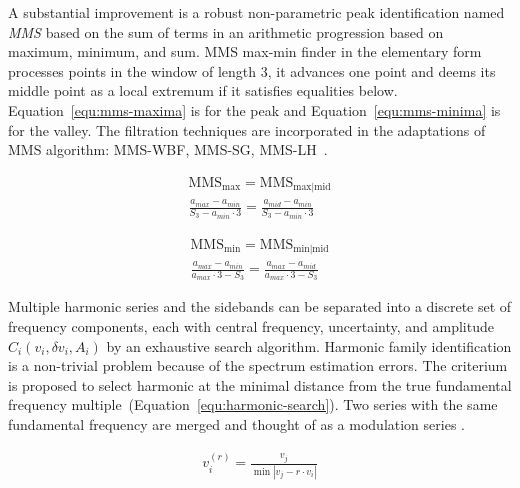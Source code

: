 A substantial improvement is a robust non-parametric peak identification named \emph{MMS} based on the sum of terms in an arithmetic progression based on maximum, minimum, and sum. MMS max-min finder in the elementary form processes points in the window of length 3, it advances one point and deems its middle point as a local extremum if it satisfies equalities below. Equation~\ref{equ:mms-maxima} is for the peak and Equation~\ref{equ:mms-minima} is for the valley. The filtration techniques are incorporated in the adaptations of MMS algorithm: MMS-WBF, MMS-SG, MMS-LH~\cite{adikaram_non-parametric_2016}.

\begin{ceqn}\begin{align}
\mathrm{MMS}_{\mathrm{max}} = \mathrm{MMS}_{\mathrm{max|mid}} \\
\frac{a_{max} - a_{min}}{S_3 - a_{min} \cdot 3} = \frac{a_{mid} - a_{min}}{S_3 - a_{min} \cdot 3}
\label{equ:mms-maxima}
 \end{align}\end{ceqn}

\begin{ceqn}\begin{align}
\mathrm{MMS}_{\mathrm{min}} = \mathrm{MMS}_{\mathrm{min|mid}} \\
\frac{a_{max} - a_{min}}{a_{max} \cdot 3 - S_3} = \frac{a_{max} - a_{mid}}{a_{max} \cdot 3 - S_3}
\label{equ:mms-minima}
 \end{align}\end{ceqn}

Multiple harmonic series and the sidebands can be separated into a discrete set of frequency components, each with central frequency, uncertainty, and amplitude $C_i(v_i, \delta v_i, A_i)$ by an exhaustive search algorithm. Harmonic family identification is a non-trivial problem because of the spectrum estimation errors. The criterium is proposed to select harmonic at the minimal distance from the true fundamental frequency multiple~(Equation~\ref{equ:harmonic-search}). Two series with the same fundamental frequency are merged and thought of as a modulation series \cite{gerber_identification_2013}.

\begin{ceqn}\begin{align}
v_i^{(r)} = \frac{v_j}{\min{|v_j - r \cdot v_i|}}
\label{equ:harmonic-search}
\end{align}\end{ceqn}
 
